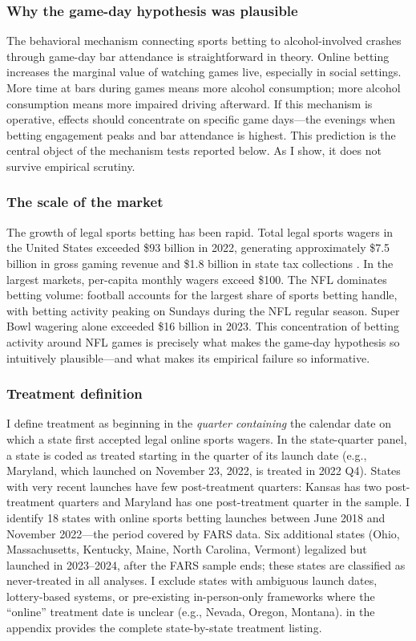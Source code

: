 \documentclass[12pt]{article}
\begin{document}
\subsubsection*{Why the game-day hypothesis was plausible} The behavioral mechanism connecting sports betting to alcohol-involved crashes through game-day bar attendance is straightforward in theory. Online betting increases the marginal value of watching games live, especially in social settings. More time at bars during games means more alcohol consumption; more alcohol consumption means more impaired driving afterward. If this mechanism is operative, effects should concentrate on specific game days---the evenings when betting engagement peaks and bar attendance is highest. This prediction is the central object of the mechanism tests reported below. As I show, it does not survive empirical scrutiny.

\subsubsection*{The scale of the market} The growth of legal sports betting has been rapid. Total legal sports wagers in the United States exceeded \$93 billion in 2022, generating approximately \$7.5 billion in gross gaming revenue and \$1.8 billion in state tax collections \citep{AGA2023}. In the largest markets, per-capita monthly wagers exceed \$100. The NFL dominates betting volume: football accounts for the largest share of sports betting handle, with betting activity peaking on Sundays during the NFL regular season. Super Bowl wagering alone exceeded \$16 billion in 2023. This concentration of betting activity around NFL games is precisely what makes the game-day hypothesis so intuitively plausible---and what makes its empirical failure so informative.

\subsubsection*{Treatment definition} I define treatment as beginning in the \textit{quarter containing} the calendar date on which a state first accepted legal online sports wagers. In the state-quarter panel, a state is coded as treated starting in the quarter of its launch date (e.g., Maryland, which launched on November 23, 2022, is treated in 2022 Q4). States with very recent launches have few post-treatment quarters: Kansas has two post-treatment quarters and Maryland has one post-treatment quarter in the sample. I identify 18 states with online sports betting launches between June 2018 and November 2022---the period covered by FARS data. Six additional states (Ohio, Massachusetts, Kentucky, Maine, North Carolina, Vermont) legalized but launched in 2023--2024, after the FARS sample ends; these states are classified as never-treated in all analyses. I exclude states with ambiguous launch dates, lottery-based systems, or pre-existing in-person-only frameworks where the ``online'' treatment date is unclear (e.g., Nevada, Oregon, Montana).  in the appendix provides the complete state-by-state treatment listing.
\end{document}
